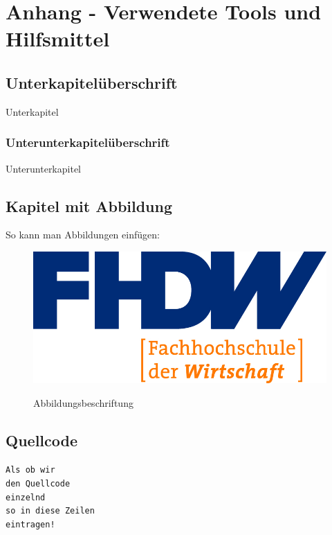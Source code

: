 \section{Anhang - Verwendete Tools und Hilfsmittel}
\label{instal}

\subsection{Unterkapitelüberschrift}

Unterkapitel

\subsubsection{Unterunterkapitelüberschrift}

Unterunterkapitel

\subsection{Kapitel mit Abbildung}

So kann man Abbildungen einfügen:

\begin{figure}[hbt]
\centering
\begin{minipage}[t]{1\textwidth} %
\caption{Abbildungsbeschriftung} %
\includegraphics[width=1\textwidth]{img/fhdw}\\ %
\end{minipage}
\end{figure}

\subsection{Quellcode}

\texttt{Als ob wir}\\
\texttt{den Quellcode}\\
\texttt{einzelnd}\\
\texttt{so in diese Zeilen}\\
\texttt{eintragen!}\\
